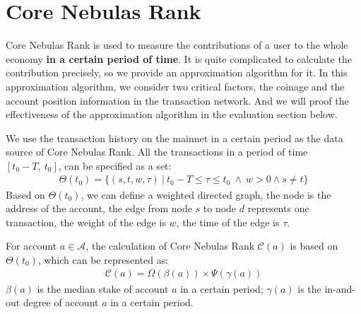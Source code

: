 \section{Core Nebulas Rank}

Core Nebulas Rank is used to measure the contributions of a user to the whole economy {\textbf{in a certain period of time}}.
It is quite complicated to calculate the contribution precisely, so we provide an approximation algorithm for it.
In this approximation algorithm, we consider two critical factors, the coinage and the account position information in the transaction network. And we will proof the effectiveness of the approximation algorithm in the evaluation section below.

We use the transaction history on the mainnet in a certain period as the data source of Core Nebulas Rank.
All the transactions in a period of time $[t_0-T,\ t_0]$, can be specified as a set:
\begin{align}
\Theta(t_0) = \{(s, t, w, \tau)\ |\ t_0 - T \le \tau \le t_0\ \land \ w > 0 \land s \neq t \}
\end{align}
\noindent Based on $\Theta(t_0)$, we can define a weighted directed graph, the node is the address of the account, the edge from node $s$ to node $d$ represents one transaction,
the weight of the edge is $w$, the time of the edge is $\tau$.

For account $a \in \mathcal{A}$, the calculation of Core Nebulas Rank $\mathcal{C}(a)$ is based on $\Theta(t_0)$, which can be represented as:
\begin{align}
\mathcal{C}(a) = \Omega(\beta(a)) \times{} \Psi(\gamma(a))
\label{eq:rank}
\end{align}
\noindent $\beta(a)$ is the median stake of account $a$ in a certain period; $\gamma(a)$ is the in-and-out degree of account $a$ in a certain period.


